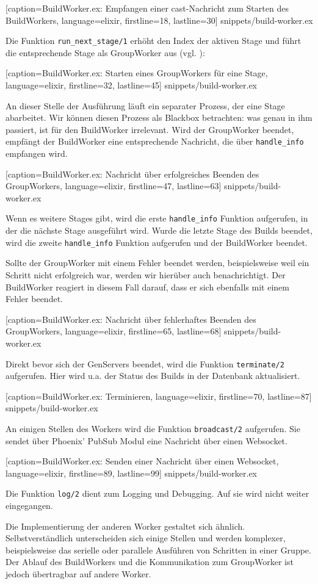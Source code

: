 
  [caption={BuildWorker.ex: Empfangen einer cast-Nachricht zum Starten des BuildWorkers},
  language=elixir,
  firstline=18,
  lastline=30]
  {snippets/build-worker.ex}

Die Funktion \texttt{run\_\allowbreak next\_\allowbreak stage/1} erhöht den Index der aktiven Stage und führt die entsprechende Stage als GroupWorker aus (vgl. ):


  [caption={BuildWorker.ex: Starten eines GroupWorkers für eine Stage},
  language=elixir,
  firstline=32,
  lastline=45]
  {snippets/build-worker.ex}

An dieser Stelle der Ausführung läuft ein separater Prozess, der eine Stage abarbeitet. Wir können diesen Prozess als Blackbox betrachten: was genau in ihm passiert, ist für den BuildWorker irrelevant. Wird der GroupWorker beendet, empfängt der BuildWorker eine entsprechende Nachricht, die über \texttt{handle\_\allowbreak info} empfangen wird.


  [caption={BuildWorker.ex: Nachricht über erfolgreiches Beenden des GroupWorkers},
  language=elixir,
  firstline=47,
  lastline=63]
  {snippets/build-worker.ex}

Wenn es weitere Stages gibt, wird die erste \texttt{handle\_\allowbreak info} Funktion aufgerufen, in der die nächste Stage ausgeführt wird. Wurde die letzte Stage des Builds beendet, wird die zweite \texttt{handle\_\allowbreak info} Funktion aufgerufen und der BuildWorker beendet.

Sollte der GroupWorker mit einem Fehler beendet werden, beispielsweise weil ein Schritt nicht erfolgreich war, werden wir hierüber auch benachrichtigt. Der BuildWorker reagiert in diesem Fall darauf, dass er sich ebenfalls mit einem Fehler beendet.


  [caption={BuildWorker.ex: Nachricht über fehlerhaftes Beenden des GroupWorkers},
  language=elixir,
  firstline=65,
  lastline=68]
  {snippets/build-worker.ex}

Direkt bevor sich der GenServers beendet, wird die Funktion \texttt{terminate/2} aufgerufen. Hier wird u.a. der Status des Builds in der Datenbank aktualisiert.


  [caption={BuildWorker.ex: Terminieren},
  language=elixir,
  firstline=70,
  lastline=87]
  {snippets/build-worker.ex}

An einigen Stellen des Workers wird die Funktion \texttt{broadcast/2} aufgerufen. Sie sendet über Phoenix' PubSub Modul eine Nachricht über einen Websocket.


  [caption={BuildWorker.ex: Senden einer Nachricht über einen Websocket},
  language=elixir,
  firstline=89,
  lastline=99]
  {snippets/build-worker.ex}

Die Funktion \texttt{log/2} dient zum Logging und Debugging. Auf sie wird nicht weiter eingegangen.

Die Implementierung der anderen Worker gestaltet sich ähnlich. Selbstverständlich unterscheiden sich einige Stellen und werden komplexer, beispielsweise das serielle oder parallele Ausführen von Schritten in einer Gruppe. Der Ablauf des BuildWorkers und die Kommunikation zum GroupWorker ist jedoch übertragbar auf andere Worker.
